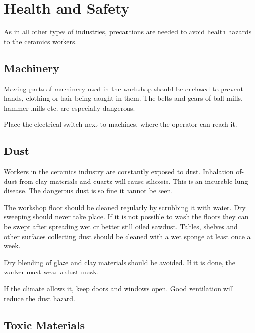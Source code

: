 \chapter{Health and Safety}
As in all other types of industries, precautions are needed to avoid health 
hazards to the ceramics workers.
\section{Machinery}
Moving parts of machinery used in the workshop should be enclosed to prevent 
hands, clothing or hair being caught in them. The belts and gears of ball 
mills, hammer mills etc. are especially dangerous.

Place the electrical switch next to machines, where the operator can reach it.
\section{Dust}
Workers in the ceramics industry are constantly exposed to dust. Inhalation 
of-dust from clay materials and quartz will cause silicosis. This is an 
incurable lung disease. The dangerous dust is so fine it cannot be seen.

The workshop floor should be cleaned regularly by scrubbing it with water. Dry 
sweeping should never take place. If it is not possible to wash the floors they 
can be swept after spreading wet or better still oiled sawdust. Tables, shelves 
and other surfaces collecting dust should be cleaned with a wet sponge at least 
once a week.

Dry blending of glaze and clay materials should be avoided. If it is done, the 
worker must wear a dust mask.

If the climate allows it, keep doors and windows open. Good ventilation will 
reduce the dust hazard.
\section{Toxic Materials}
